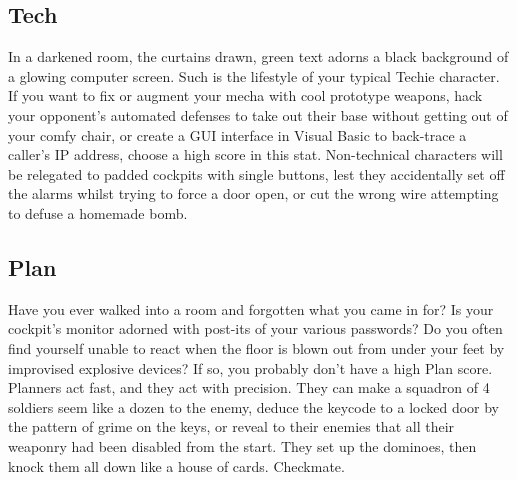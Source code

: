 \subsection{Tech}
In a darkened room, the curtains drawn, green text adorns a black background of a glowing computer screen. Such is the lifestyle of your typical Techie character. If you want to fix or augment your mecha with cool prototype weapons, hack your opponent's automated defenses to take out their base without getting out of your comfy chair, or create a GUI interface in Visual Basic to back-trace a caller's IP address, choose a high score in this stat. Non-technical characters will be relegated to padded cockpits with single buttons, lest they accidentally set off the alarms whilst trying to force a door open, or cut the wrong wire attempting to defuse a homemade bomb.

\subsection{Plan}
Have you ever walked into a room and forgotten what you came in for? Is your cockpit's monitor adorned with post-its of your various passwords? Do you often find yourself unable to react when the floor is blown out from under your feet by improvised explosive devices? If so, you probably don't have a high Plan score. Planners act fast, and they act with precision. They can make a squadron of 4 soldiers seem like a dozen to the enemy, deduce the keycode to a locked door by the pattern of grime on the keys, or reveal to their enemies that all their weaponry had been disabled from the start. They set up the dominoes, then knock them all down like a house of cards. Checkmate.
